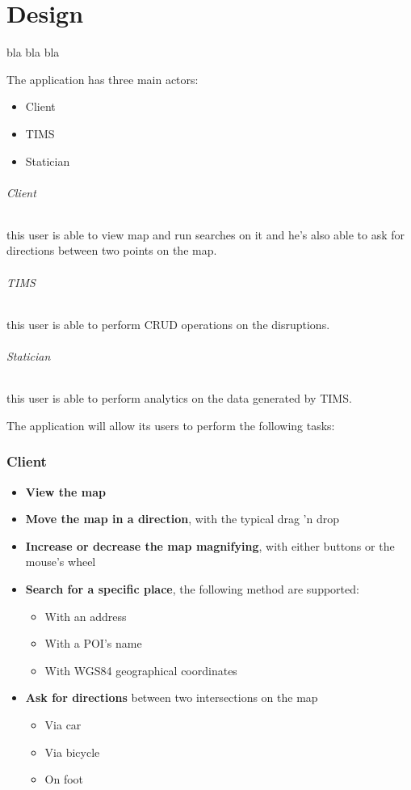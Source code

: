
\part{Design}


bla bla bla


The application has three main actors:
\begin{itemize}
	\item Client
	\item TIMS
	\item Statician
\end{itemize}

\paragraph{Client}
this user is able to view map and run searches on it and he’s also able to ask 
for directions between two points on the map.

\paragraph{TIMS}
this user is able to perform CRUD operations on the disruptions.

\paragraph{Statician}
this user is able to perform analytics on the data generated by TIMS.


The application will allow its users to perform the following tasks:

\section{Client}

\begin{itemize}
	\item \textbf{View the map}
	\item \textbf{Move the map in a direction}, with the typical drag 'n drop
	\item \textbf{Increase or decrease the map magnifying}, with either buttons 
	or the mouse's wheel
	\item \textbf{Search for a specific place}, the following method are 
	supported:
	\begin{itemize}
		\item With an address
		\item With a POI's name
		\item With WGS84 geographical coordinates
	\end{itemize}
	\item \textbf{Ask for directions} between two intersections on the map
	\begin{itemize}
		\item Via car
		\item Via bicycle
		\item On foot
	\end{itemize}
\end{itemize}

